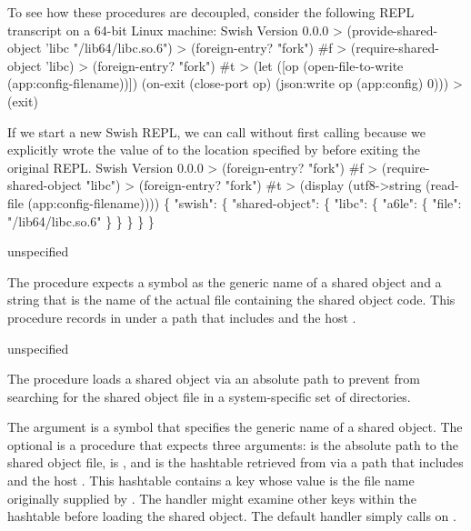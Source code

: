 To see how these procedures are decoupled, consider the following REPL
transcript on a 64-bit Linux machine:
\codebegin
Swish Version 0.0.0
> (provide-shared-object 'libc "/lib64/libc.so.6")
> (foreign-entry? "fork")
#f
> (require-shared-object 'libc)
> (foreign-entry? "fork")
#t
> (let ([op (open-file-to-write (app:config-filename))])
    (on-exit (close-port op)
      (json:write op (app:config) 0)))
> (exit)
\codeend

If we start a new Swish REPL, we can call 
without first calling 
because we explicitly wrote the value of  to the location
specified by  before exiting the original REPL.
\codebegin
Swish Version 0.0.0
> (foreign-entry? "fork")
#f
> (require-shared-object "libc")
> (foreign-entry? "fork")
#t
> (display (utf8->string (read-file (app:config-filename))))
\{
  "swish": \{
    "shared-object": \{
      "libc": \{
        "a6le": \{
          "file": "/lib64/libc.so.6"
        \}
      \}
    \}
  \}
\}
\codeend

\begin{procedure}
\end{procedure}
\returns{} unspecified

The  procedure expects a symbol
 as the generic name of a shared object and
a string  that is the
name of the actual file containing the shared object code.
This procedure records  in  under a
path that includes  and the host .

\begin{procedure}
\end{procedure}
\returns{} unspecified

The  procedure loads a shared object via an
absolute path to prevent  from searching for the
shared object file in a system-specific set of directories.

The  argument is a symbol that specifies the generic name of a
shared object.
The optional  is a procedure that expects three arguments:
 is the absolute path to the shared object file,
 is , and  is the hashtable
retrieved from  via a path that includes
 and the host .
This hashtable contains a key  whose value
is the file name originally supplied by .
The handler might examine other keys within the hashtable before
loading the shared object.
The default handler simply calls  on .

